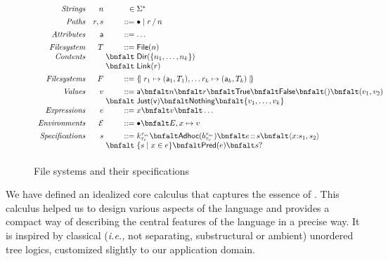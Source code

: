\begin{figure}
\[
\begin{array}{rr@{\;}r@{\;}l}
\textit{Strings}        & n & \in & \Sigma^{\ast} \\[1ex]
\textit{Paths}          & r,s & \bnfdef & \PNil \mid \PCons{r}{n} \\[1ex]
\textit{Attributes}     & \att  & \bnfdef & \dots\\[1ex]
\textit{Filesystem}     & T  & \bnfdef & \File{n} \\
\textit{Contents}       &    & \bnfalt & \Dir{ \Set{n_1,\dots,n_k} }\\
                        &    & \bnfalt & \Link{r}\\[1ex]
\textit{Filesystems}    & F & \bnfdef & \Map{ r_1 \mapsto (\att_1,T_1), \dots r_k \mapsto (\att_k,T_k) }\\[1ex]
\textit{Values}         & v & \bnfdef & \att \bnfalt n \bnfalt r \bnfalt \True \bnfalt \False \bnfalt () \bnfalt (v_1,v_2) \\
                        &   & \bnfalt & \Just{v} \bnfalt \Nothing \bnfalt \{ v_1,\dots,v_k \}\\
\textit{Expressions}    & e & \bnfdef & x \bnfalt v \bnfalt \dots \\[1ex]
\textit{Environments}   & \Env & \bnfdef & \ENil \bnfalt E,x\mapsto v \\[1ex]
\textit{Specifications} & s & \bnfdef & \Sk 
                              \bnfalt \SAdhoc{b}
                              \bnfalt \SPath{e}{s}
                              \bnfalt \SPair{x}{s_1}{s_2}\\
                        &   & \bnfalt & \SSetComp{s}{x}{e}
                              \bnfalt \SPred{e}
                              \bnfalt \SOption{s}\\[1ex]
\end{array}
\]
\caption{File systems and their specifications}
\label{fig:calculus-syntax}
\end{figure}

We have defined an idealized core calculus that captures the
essence of \forest{}.  This calculus helped us to design various
aspects of the language and provides a compact way of describing the
central features of the language in a precise way.  It is inspired by
classical ({\em i.e.,} not separating, substructural or ambient)
unordered tree logics, customized slightly to our application domain.

